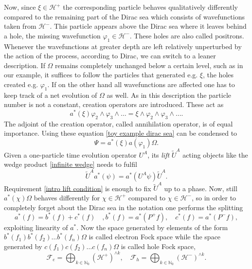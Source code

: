 \documentclass[b5paper,draft,openbib,12pt]{memoir}
\begin{document}
Now, since \(\xi \in \mathcal{H}^+\) the corresponding particle 
behaves qualitatively differently compared to the remaining 
part of the 
Dirac sea which consists of wavefunctions taken from 
\(\mathcal{H}^-\). This particle appears above the Dirac sea
where it leaves behind a hole, the missing wavefunction 
\(\varphi_1\in\mathcal{H}^-\). These holes are also called positrons. 
Whenever the wavefunctions 
at greater depth are left relatively unperturbed by the action 
of the process, according to Dirac, we can switch to a leaner  
description. If \(\Omega\) remains completely unchanged below a 
certain level, such as in our example,  it
suffices to follow the particles that generated 
e.g. \(\xi\), the holes created e.g. \(\varphi_1\). If on the 
other hand all wavefunctions are affected one has to keep track
of a net evolution of \(\Omega\) as well. As in this description
the particle number is not a constant, creation operators 
are introduced. These act as 
\begin{equation}
a^*(\xi)\varphi_2\wedge \varphi_3\wedge\dots = \xi\wedge \varphi_2\wedge \varphi_3\wedge\dots.
\end{equation}
The adjoint of the creation operator, called 
annihilation operator, is of equal importance.  
Using these equation \eqref{toy example dirac sea}
can be condensed to 
\begin{equation}
\Psi= a^*(\xi)a(\varphi_1)\Omega.
\end{equation}
Given a one-particle time evolution operator \(U^A\), its 
\emph{lift} \(\tilde{U}^A\) acting objects like the 
wedge product \eqref{infinite wedge}
needs to fulfil
\begin{equation}\label{intro lift condition}
\tilde{U}^A a^*(\psi)=a^*(U^A\psi )\tilde{U}^A.
\end{equation}
Requirement \eqref{intro lift condition} is enough to fix 
\(\tilde{U}^A\) up to a phase. Now, still \(a^*(\chi)\Omega\)
behaves differently for \(\chi\in\mathcal{H}^+\) compared to 
\(\chi\in\mathcal{H}^-\), so in order to completely forget 
about the Dirac sea in the notation one performs the splitting 
\begin{equation}
a^*(f)= b^*(f)+ c^*(f) \quad, b^*(f)=a^*(P^+f),\quad c^*(f)=a^*(P^-f),
\end{equation}
exploiting linearity of \(a^*\).  Now the space generated by 
elements of the form \(b^*(f_1)b^*(f_2)\dots b^*(f_n)\Omega\)
is called electron Fock space while the space generated by
\(c(f_1)c(f_2)\dots c(f_n)\Omega\) is called hole 
Fock space,
\begin{equation}
  \mathcal{F}_e= \bigoplus_{k\in\mathbb{N}_0} (\mathcal{H}^+)^{\wedge k},\quad 
  \mathcal{F}_h= \bigoplus_{k\in\mathbb{N}_0} (\mathcal{H}^-)^{\wedge k}.
\end{equation}
\end{document}
